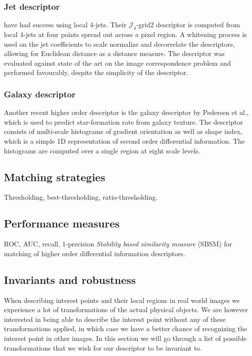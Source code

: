 \documentclass[thesis.tex]{subfiles}
\begin{document}
\subsubsection{Jet descriptor}

\cite{larsen2012jet} have had success using local 4-jets. Their
$\mathcal{J}_4$-grid2 descriptor is computed from local 4-jets at four points
spread out across a pixel region. A whitening process is used on the jet
coefficients to scale normalize and decorrelate the descriptors, allowing for
Euclidean distance as a distance measure. The descriptor was evaluated against
state of the art on the image correspondence problem and performed favourably,
despite the simplicity of the descriptor.

\subsubsection{Galaxy descriptor}

Another recent higher order descriptor is the galaxy descriptor by Pedersen
et al.\cite{pedersen2013shape}, which is used to predict star-formation
rate from galaxy texture. The descriptor consists of multi-scale histograms
of gradient orientation as well as shape index, which is a simple 1D
representation of second order differential information. The histograms are
computed over a single region at eight scale levels.

\subsection{Matching strategies}
\label{sec:matching_strategies}

Thresholding, best-thresholding, ratio-thresholding.

\subsection{Performance measures}
\label{sec:performance_measures}

ROC, AUC, recall, 1-precision
\emph{Stability based similarity measure} (SBSM) \cite{balmashnova2008novel} for matching of higher order differential information descriptors.


\subsection{Invariants and robustness}
When describing interest points and their local regions in real world images we experience a lot of transformations of the actual physical objects. We are however interested in being able to describe the interest point without any of these transformations applied, in which case we have a better chance of recognizing the interest point in other images. In this section we will go through a list of possible transformations that we wish for our descriptor to be invariant to.
\end{document}
